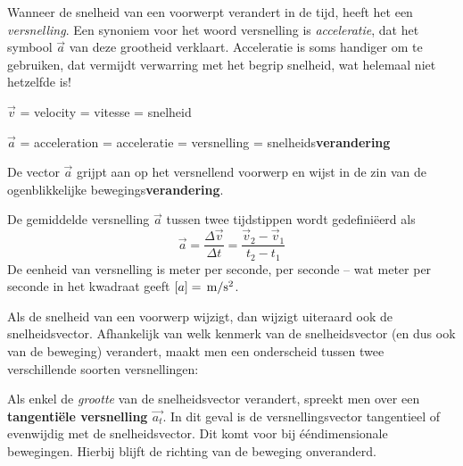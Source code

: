 \documentclass{ximera}
\begin{document}
	\author{Bart Lambregs, Vincent Gellens}
    \xmsource\xmuitleg

	
Wanneer de snelheid van een voorwerpt verandert in de tijd, heeft het een \textit{versnelling}. 
Een synoniem voor het woord versnelling is \textit{acceleratie}, dat het symbool \(\vec{a}\) van deze grootheid verklaart. 
Acceleratie is soms handiger om te gebruiken, dat vermijdt verwarring met het begrip snelheid, wat helemaal niet hetzelfde is!


\(\vec{v}\) = velocity = vitesse = snelheid

\(\vec{a}\) = acceleration = acceleratie = versnelling = snelheids\textbf{verandering}

De vector \(\vec{a}\) grijpt aan op het versnellend voorwerp en wijst in de zin van de ogenblikkelijke bewegings\textbf{verandering}.

\begin{definition}

De gemiddelde versnelling \(\vec{a}\) tussen twee tijdstippen wordt gedefiniëerd als
\[
\vec{a}=\frac{\Delta \vec{v}}{\Delta t}=\frac{\vec{v}_2-\vec{v}_1}{t_2-t_1}
\]
De eenheid van versnelling is meter per seconde, per seconde -- wat meter per seconde in het kwadraat geeft $[a]=\rm\,m/s^2$.

\end{definition}

Als de snelheid van een voorwerp wijzigt, dan wijzigt uiteraard ook de snelheidsvector. Afhankelijk van welk kenmerk van de snelheidsvector (en dus ook van de beweging) verandert, maakt men een onderscheid tussen twee verschillende soorten versnellingen:


\begin{definition}
Als enkel de \textit{grootte} van de snelheidsvector verandert, spreekt men over een \textbf{tangentiële versnelling \(\vec{a_t}\)}. In dit geval is de versnellingsvector tangentieel of evenwijdig met de snelheidsvector. Dit komt voor bij ééndimensionale bewegingen. Hierbij blijft de richting van de beweging onveranderd.
\end{definition}
\end{document}
